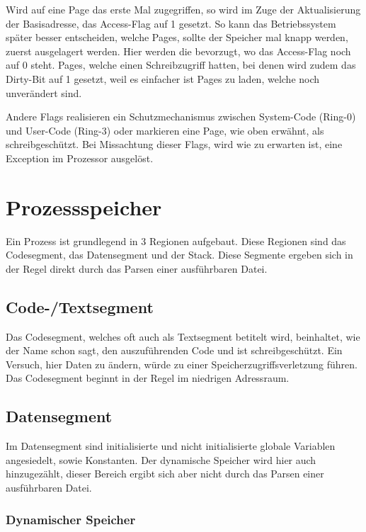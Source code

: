 \documentclass[12pt]{book}
\begin{document}
Wird auf eine Page das erste Mal zugegriffen, so wird im Zuge der
Aktualisierung der Basisadresse, das Access-Flag auf 1 gesetzt.  So kann das
Betriebssystem später besser entscheiden, welche Pages, sollte der Speicher mal
knapp werden, zuerst ausgelagert werden. Hier werden die bevorzugt, wo das
Access-Flag noch auf 0 steht. Pages, welche einen Schreibzugriff hatten, bei
denen wird zudem das Dirty-Bit auf 1 gesetzt, weil es einfacher ist Pages zu
laden, welche noch unverändert sind.

Andere Flags realisieren ein Schutzmechanismus zwischen System-Code (Ring-0)
und User-Code (Ring-3) oder markieren eine Page, wie oben erwähnt, als
schreibgeschützt. Bei Missachtung dieser Flags, wird wie zu erwarten ist, eine
Exception im Prozessor ausgelöst.

\section{Prozessspeicher}

Ein Prozess ist grundlegend in 3 Regionen aufgebaut. Diese Regionen sind das
Codesegment, das Datensegment und der Stack. Diese Segmente ergeben sich in der
Regel direkt durch das Parsen einer ausführbaren Datei.

\subsection{Code-/Textsegment}

Das Codesegment, welches oft auch als Textsegment betitelt wird, beinhaltet,
wie der Name schon sagt, den auszuführenden Code und ist schreibgeschützt. Ein
Versuch, hier Daten zu ändern, würde zu einer Speicherzugriffsverletzung
führen. Das Codesegment beginnt in der Regel im niedrigen Adressraum.

\subsection{Datensegment}

Im Datensegment sind initialisierte und nicht initialisierte globale Variablen
angesiedelt, sowie Konstanten. Der dynamische Speicher wird hier auch
hinzugezählt, dieser Bereich ergibt sich aber nicht durch das Parsen einer
ausführbaren Datei.

\subsubsection{Dynamischer Speicher}
\end{document}
